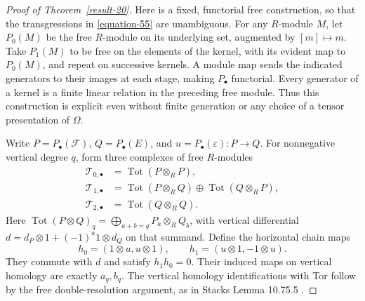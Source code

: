\documentclass[11pt,a4paper]{article}
\theoremstyle{definition}
\begin{document}
\begin{proof}[Proof of Theorem~\ref{result-20}]
Here is a fixed, functorial free construction, so that the
transgressions in \eqref{equation-55} are unambiguous. For any $R$-module $M$,
let $P_0(M)$ be the free $R$-module on its underlying set, augmented
by $[m]\mapsto m$. Take $P_1(M)$ to be free on the elements of the
kernel, with its evident map to $P_0(M)$, and repeat on successive
kernels. A module map sends the indicated generators to their
images at each stage, making $P_\bullet$ functorial. Every generator
of a kernel is a finite linear relation in the preceding free
module. Thus this construction is explicit even without finite
generation or any choice of a tensor presentation of $\Omega$.

Write $P=P_\bullet(\mathcal F)$, $Q=P_\bullet(E)$, and
$u=P_\bullet(\varepsilon):P\to Q$. For nonnegative vertical degree
$q$, form three complexes of free $R$-modules
\begin{equation}
\begin{aligned}
 \mathcal T_{0,\bullet}&=\operatorname{Tot}(P\otimes_RP),\\
 \mathcal T_{1,\bullet}&=\operatorname{Tot}(P\otimes_RQ)
                         \oplus\operatorname{Tot}(Q\otimes_RP),\\
 \mathcal T_{2,\bullet}&=\operatorname{Tot}(Q\otimes_RQ).
\end{aligned}                                           \label{equation-59}
\end{equation}
Here $\operatorname{Tot}(P\otimes Q)_q=
\bigoplus_{a+b=q}P_a\otimes_RQ_b$, with vertical differential
$d=d_P\otimes1+(-1)^a1\otimes d_Q$ on that summand.
Define the horizontal chain maps
\begin{equation}
 h_0=(1\otimes u,u\otimes1),\qquad
 h_1=(u\otimes1,-1\otimes u).                            \label{equation-60}
\end{equation}
They commute with $d$ and satisfy $h_1h_0=0$.
Their induced maps on vertical homology are exactly $a_q,b_q$.
The vertical homology identifications with Tor follow by the free
double-resolution argument, as in Stacks Lemma 10.75.5
\cite{StacksTor}.


\end{proof}
\end{document}
